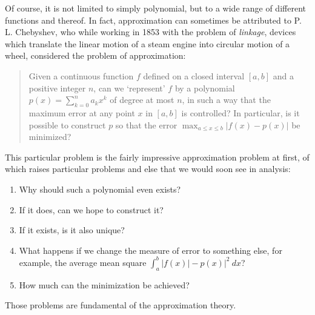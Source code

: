 Of course, it is not limited to simply polynomial, but to a wide range of different functions and thereof. In fact, approximation can sometimes be attributed to P. L. Chebyshev, who while working in 1853 with the problem of \textit{linkage}, devices which translate the linear motion of a steam engine into circular motion of a wheel, considered the problem of approximation:
\begin{quote}
    Given a continuous function $f$ defined on a closed interval $[a,b]$ and a positive integer $n$, can we `represent' $f$ by a polynomial $p(x)=\sum_{k=0}^{n}a_{k}x^{k}$ of degree at most $n$, in such a way that the maximum error at any point $x$ in $[a,b]$ is controlled? In particular, is it possible to construct $p$ so that the error $\max_{a\leq x\leq b}|f(x)-p(x)|$ be minimized? 
\end{quote}
This particular problem is the fairly impressive approximation problem at first, of which raises particular problems and else that we would soon see in analysis: 
\begin{enumerate}[topsep=1pt,itemsep=1pt]
    \item Why should such a polynomial even exists? 
    \item If it does, can we hope to construct it? 
    \item If it exists, is it also unique? 
    \item What happens if we change the measure of error to something else, for example, the average mean square $\int_{a}^{b}|f(x)|-p(x)|^{2}\:dx$?
    \item How much can the minimization be achieved? 
\end{enumerate}

Those problems are fundamental of the approximation theory. 

